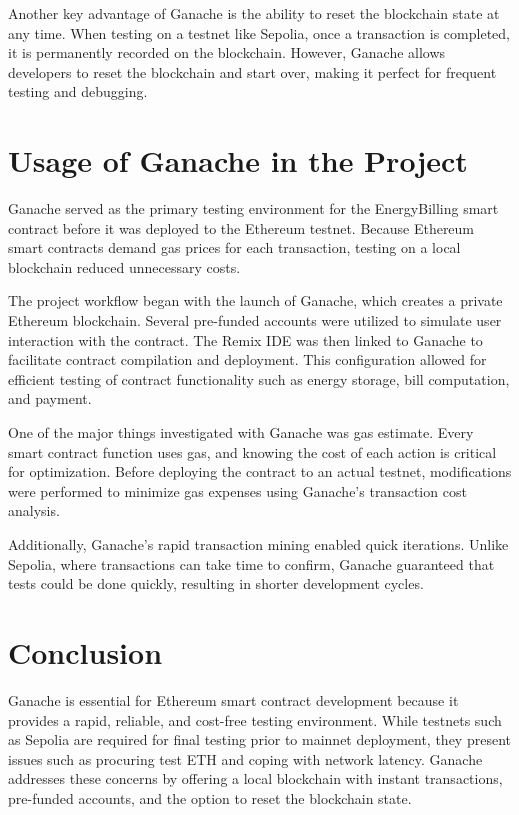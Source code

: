 \documentclass[a4paper,12pt]{report}
\begin{document}
Another key advantage of Ganache is the ability to reset the blockchain state at any time.  When testing on a testnet like Sepolia, once a transaction is completed, it is permanently recorded on the blockchain.  However, Ganache allows developers to reset the blockchain and start over, making it perfect for frequent testing and debugging.


\section{Usage of Ganache in the Project}
Ganache served as the primary testing environment for the EnergyBilling smart contract before it was deployed to the Ethereum testnet.  Because Ethereum smart contracts demand gas prices for each transaction, testing on a local blockchain reduced unnecessary costs.

The project workflow began with the launch of Ganache, which creates a private Ethereum blockchain.  Several pre-funded accounts were utilized to simulate user interaction with the contract.  The Remix IDE was then linked to Ganache to facilitate contract compilation and deployment.  This configuration allowed for efficient testing of contract functionality such as energy storage, bill computation, and payment.


One of the major things investigated with Ganache was gas estimate.  Every smart contract function uses gas, and knowing the cost of each action is critical for optimization.  Before deploying the contract to an actual testnet, modifications were performed to minimize gas expenses using Ganache's transaction cost analysis.

Additionally, Ganache's rapid transaction mining enabled quick iterations.  Unlike Sepolia, where transactions can take time to confirm, Ganache guaranteed that tests could be done quickly, resulting in shorter development cycles.


\section{Conclusion}
Ganache is essential for Ethereum smart contract development because it provides a rapid, reliable, and cost-free testing environment.  While testnets such as Sepolia are required for final testing prior to mainnet deployment, they present issues such as procuring test ETH and coping with network latency.  Ganache addresses these concerns by offering a local blockchain with instant transactions, pre-funded accounts, and the option to reset the blockchain state.
\end{document}
